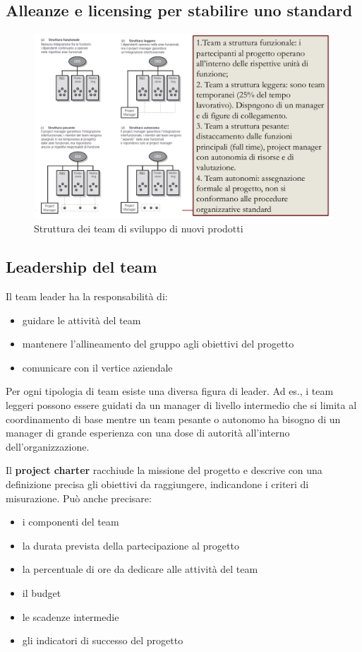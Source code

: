 \documentclass{article}
\begin{document}
\subsection{Alleanze e licensing per stabilire uno standard}
\begin{figure}[h!]
	\centering
	\includegraphics[scale=0.4]{images/ceo.png}
	\caption{Struttura dei team di sviluppo di nuovi prodotti}
	\label{fig:team}
\end{figure}

\subsection{Leadership del team }
Il team leader ha la responsabilità di:
\begin{itemize}
\item guidare le attività del team
\item mantenere l’allineamento del gruppo agli obiettivi del
progetto
\item comunicare con il vertice aziendale
\end{itemize}

Per ogni tipologia di team esiste una diversa figura di leader.
Ad es., i team leggeri possono essere guidati da un manager di
livello intermedio che si limita al coordinamento di base mentre un
team pesante o autonomo ha bisogno di un manager di grande
esperienza con una dose di autorità all’interno dell’organizzazione.

Il \textbf{project charter} racchiude la missione del progetto e descrive con
una definizione precisa gli obiettivi da raggiungere, indicandone i
criteri di misurazione. Può anche precisare:
\begin{itemize}

\item i componenti del team
\item la durata prevista della partecipazione al progetto
\item la percentuale di ore da dedicare alle attività del team
\item il budget
\item le scadenze intermedie
\item  gli indicatori di successo del progetto

\end{itemize}
\end{document}
